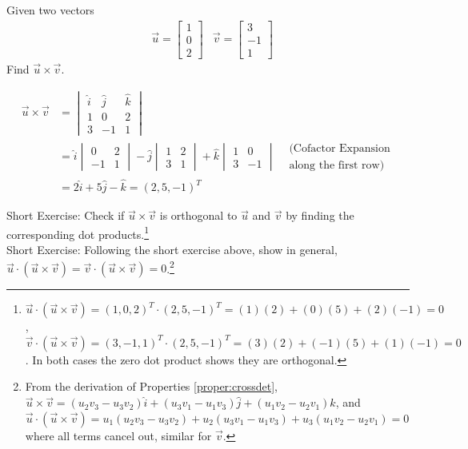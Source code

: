 \begin{exmp}
Given two vectors
\begin{align*}
&\vec{u} =
\begin{bmatrix}
1 \\
0 \\
2
\end{bmatrix}
&\vec{v} =
\begin{bmatrix}
3 \\
-1 \\
1
\end{bmatrix}
\end{align*}
Find $\vec{u} \times \vec{v}$.
\end{exmp}
\begin{solution}
\begin{align*}
\vec{u} \times \vec{v} &=
\begin{vmatrix}
\hat{i} & \hat{j} & \hat{k} \\
1 & 0 & 2 \\
3 & -1 & 1
\end{vmatrix} \\
&= 
\hat{i}
\begin{vmatrix}
0 & 2 \\
-1 & 1 
\end{vmatrix}
- \hat{j}
\begin{vmatrix}
1 & 2 \\
3 & 1 
\end{vmatrix}
+ \hat{k}
\begin{vmatrix}
1 & 0 \\
3 & -1 
\end{vmatrix}
& \begin{aligned}
\text{(Cofactor Expansion} \\ 
\text{along the first row)}
\end{aligned}\\
&= 2\hat{i} + 5\hat{j} - \hat{k} = (2,5,-1)^T
\end{align*} 
\end{solution}
Short Exercise: Check if $\vec{u} \times \vec{v}$ is orthogonal to $\vec{u}$ and $\vec{v}$ by finding the corresponding dot products.\footnote{$\vec{u} \cdot (\vec{u} \times \vec{v}) = (1,0,2)^T\cdot(2,5,-1)^T = (1)(2) + (0)(5) + (2)(-1) = 0$, $\vec{v} \cdot (\vec{u} \times \vec{v}) = (3,-1,1)^T\cdot(2,5,-1)^T = (3)(2) + (-1)(5) + (1)(-1) = 0$. In both cases the zero dot product shows they are orthogonal.}\\
Short Exercise: Following the short exercise above, show in general, $\vec{u} \cdot (\vec{u} \times \vec{v}) = \vec{v} \cdot (\vec{u} \times \vec{v}) = 0$.\footnote{From the derivation of Properties \ref{proper:crossdet}, $\vec{u} \times \vec{v} = (u_2v_3 - u_3v_2)\hat{i} + (u_3v_1 - u_1v_3)\hat{j} + (u_1v_2 - u_2v_1)\hat{k}$, and $\vec{u} \cdot (\vec{u} \times \vec{v}) = u_1(u_2v_3 - u_3v_2) + u_2(u_3v_1 - u_1v_3) + u_3(u_1v_2 - u_2v_1) = 0$ where all terms cancel out, similar for $\vec{v}$.}


